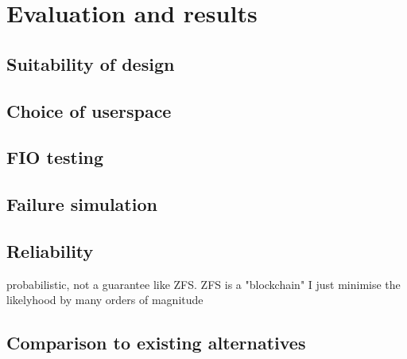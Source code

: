\chapter{Evaluation and results}

    \section{Suitability of design}

    \section{Choice of userspace}

    \section{FIO testing}

    \section{Failure simulation}

    \section{Reliability}

        probabilistic, not a guarantee like ZFS. ZFS is a "blockchain" I just
        minimise the likelyhood by many orders of magnitude

    \section{Comparison to existing alternatives}
